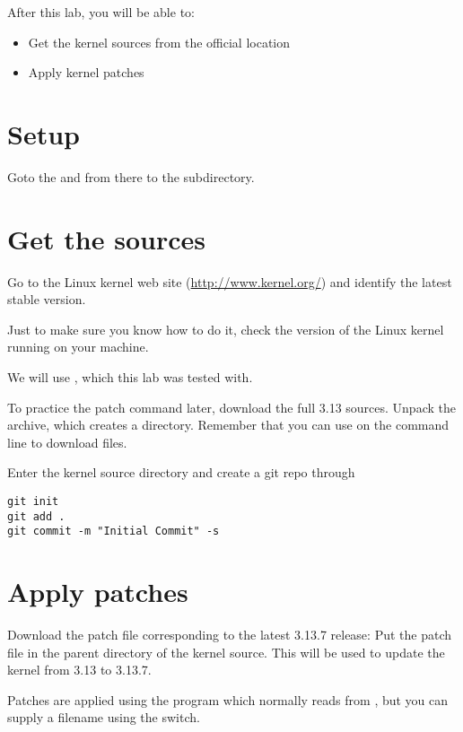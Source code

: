 
After this lab, you will be able to:
\begin{itemize}
\item Get the kernel sources from the official location
\item Apply kernel patches
\end{itemize}

\section{Setup}

Goto the \labdir and from there to the  subdirectory.

\section{Get the sources}

Go to the Linux kernel web site (\url{http://www.kernel.org/}) and
identify the latest stable version.

Just to make sure you know how to do it, check the version of the
Linux kernel running on your machine.

We will use , which this lab was tested with.

To practice the patch command later, download the full 3.13
sources. Unpack the archive, which creates a 
directory. Remember that you can use  on the command
line to download files.

Enter the kernel source directory and create a git repo through

\begin{verbatim}
git init
git add .
git commit -m "Initial Commit" -s
\end{verbatim}
\clearpage
\section{Apply patches}

Download the patch file corresponding to the latest 3.13.7 release:
Put the patch file in the parent directory of the kernel source.
This will be used to update the kernel from 3.13 to 3.13.7.

Patches are applied using the  program which normally reads from ,
but you can supply a filename using the  switch.

